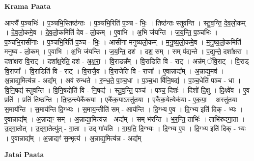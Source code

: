 \documentclass[17pt]{extarticle}
\begin{document}
\textbf{Krama Paata} \newline

आप्त्यै॑ प॒ञ्चभिः॑ । प॒ञ्चभि॒स्तिष्ठ॑न्तः । प॒ञ्चभि॒रिति॑ प॒ञ्च - भिः॒ । तिष्ठ॑न्तः स्तुवन्ति । स्तु॒व॒न्ति॒ दे॒व॒लो॒कम् । दे॒व॒लो॒कमे॒व । दे॒व॒लो॒कमिति॑ देव - लो॒कम् । ए॒वाभि । अ॒भि ज॑यन्ति । ज॒य॒न्ति॒ प॒ञ्चभिः॑ । प॒ञ्चभि॒रासी॑नाः । प॒ञ्चभि॒रिति॑ प॒ञ्च - भिः॒ । आसी॑ना मनुष्यलो॒कम् । म॒नु॒ष्य॒लो॒कमे॒व । म॒नु॒ष्य॒लो॒कमिति॑ मनुष्य - लो॒कम् । ए॒वाभि । अ॒भि ज॑यन्ति । ज॒य॒न्ति॒ दश॑ । दश॒ सम् । सम् प॑द्यन्ते । प॒द्य॒न्ते॒ दशा᳚क्षरा । दशा᳚क्षरा वि॒राट् । दशा᳚क्ष॒रेति॒ दश॑ - अ॒क्ष॒रा॒ । वि॒राडन्न᳚म् । वि॒राडिति॑ वि - राट् । अन्न॑म् ॅवि॒राट् । वि॒राड् वि॒राजा᳚ । वि॒राडिति॑ वि - राट् । वि॒राजै॒व । वि॒राजेति॑ वि - राजा᳚ । ए॒वान्नाद्य᳚म् । अ॒न्नाद्य॒मव॑ । अ॒न्नाद्य॒मित्य॑न्न - अद्य᳚म् । अव॑ रुन्धते । रु॒न्ध॒ते॒ प॒ञ्च॒धा । प॒ञ्च॒धा वि॑नि॒षद्य॑ । प॒ञ्च॒धेति॑ पञ्च - धा । वि॒नि॒षद्य॑ स्तुवन्ति । वि॒नि॒षद्येति॑ वि - नि॒षद्य॑ । स्तु॒व॒न्ति॒ पञ्च॑ । पञ्च॒ दिशः॑ । दिशो॑ दि॒क्षु । दि॒क्ष्वे॑व । ए॒व प्रति॑ । प्रति॑ तिष्ठन्ति । ति॒ष्ठ॒न्त्येकै॑कया । एकै॑क॒याऽस्तु॑तया । एकै॑क॒येत्येक॑या - ए॒क॒या॒ । अस्तु॑तया स॒माय॑न्ति । स॒माय॑न्ति दि॒ग्भ्यः । स॒माय॒न्तीति॑ सम् - आय॑न्ति । दि॒ग्भ्य ए॒व । दि॒ग्भ्य इति॑ दिक् - भ्यः । ए॒वान्नाद्य᳚म् । अ॒न्नाद्यꣳ॒॒ सम् । अ॒न्नाद्या॒मित्य॑न्न - अद्य᳚म् । सम् भ॑रन्ति । भ॒र॒न्ति॒ ताभिः॑ । ताभि॑रुद्‍गा॒ता । उ॒द्‍गा॒तोत् । उ॒द्‍गा॒तेत्यु॑त् - गा॒ता । उद् गा॑यति । गा॒य॒ति॒ दि॒ग्भ्यः । दि॒ग्भ्य ए॒व । दि॒ग्भ्य इति॑ दिक् - भ्यः । ए॒वान्नाद्य᳚म् । अ॒न्नाद्यꣳ॑ स॒म्भृत्य॑ । अ॒न्नाद्य॒मित्य॑न्न - अद्य᳚म् \newline

\textbf{Jatai Paata} \newline
\end{document}
